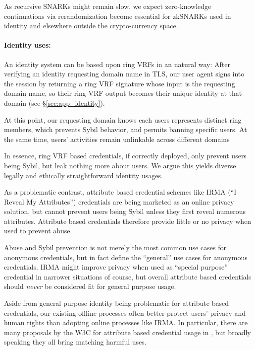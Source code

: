 As recursive SNARKs might remain slow,
we expect zero-knowledge continuations via rerandomization become
essential for zkSNARKs used in identity and elsewhere outside the crypto-currency space.

\paragraph{Identity uses:}

An identity system can be based upon ring VRFs in an natural way:
After verifying an identity requesting domain name in TLS,
our user agent signs into the session by returning a ring VRF
signature whose input is the requesting domain name, so their
ring VRF output becomes their unique identity at that domain
(see \S\ref{sec:app_identity}).

At this point, our requesting domain knows each users represents
distinct ring members, which prevents Sybil behavior, and permits
banning specific users.
At the same time, users' activities remain unlinkable across different
domains

In essence, ring VRF based credentials, if correctly deployed, only
prevent users being Sybil, but leak nothing more about users.  We argue
this yields diverse legally and ethically straightforward identity usages.

As a problematic contrast, attribute based credential schemes like
IRMA (``I Reveal My Attributes'') credentials \cite{IRMAcredentials}
are being marketed as an online privacy solution, but cannot prevent
users being Sybil unless they first reveal numerous attributes.
Attribute based credentials therefore provide little or no privacy
when used to prevent abuse.

Abuse and Sybil prevention is not merely the most common use cases for
anonymous credentials, but in fact define the ``general'' use cases for
anonymous credentials.
IRMA might improve privacy when used as ``special purpose'' credential 
in narrower situations of course, but overall attribute based credentials
should {\it never} be considered fit for general purpose usage.

Aside from general purpose identity being problematic for attribute based
credentials, our existing offline processes often better protect users'
privacy and human rights than adopting online processes like IRMA.
%
In particular, there are many proposals by the W3C for attribute based
credential usage in \cite{w3c_vc_use_cases}, but broadly speaking they
all bring matching harmful uses.  %

